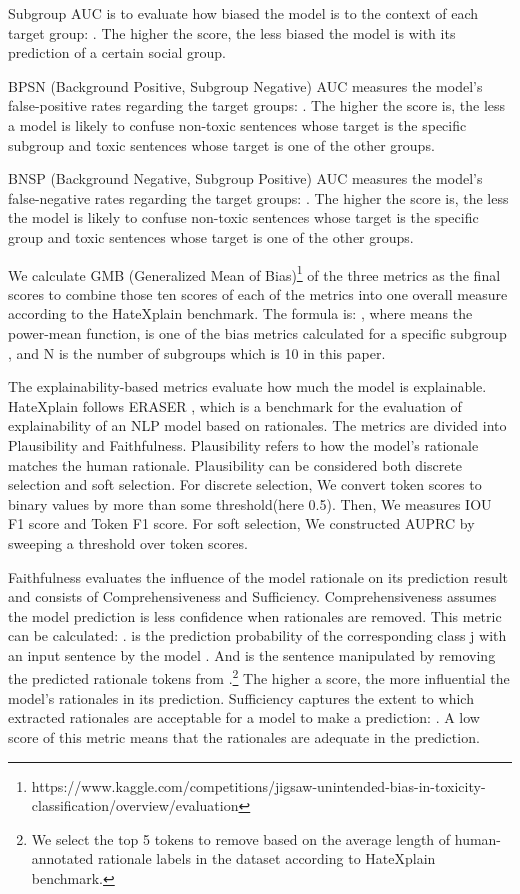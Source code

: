\documentclass[11pt]{article}
\begin{document}
Subgroup AUC is to evaluate how biased the model is to the context of each target group: .
The higher the score, the less biased the model is with its prediction of a certain social group. 


BPSN (Background Positive, Subgroup Negative) AUC measures the model's false-positive rates regarding the target groups: . 
The higher the score is, the less a model is likely to confuse non-toxic sentences whose target is the specific subgroup and toxic sentences whose target is one of the other groups. 


BNSP (Background Negative, Subgroup Positive) AUC measures the model's false-negative rates regarding the target groups: . The higher the score is, the less the model is likely to confuse non-toxic sentences whose target is the specific group and toxic sentences whose target is one of the other groups. 


We calculate GMB (Generalized Mean of Bias)\footnote[1]{https://www.kaggle.com/competitions/jigsaw-unintended-bias-in-toxicity-classification/overview/evaluation} 
of the three metrics as the final scores to combine those ten scores of each of the metrics into one overall measure according to the HateXplain benchmark.
The formula is: , where  means the  power-mean function,  is one of the bias metrics  calculated for a specific subgroup , and N is the number of subgroups which is 10 in this paper. 




The explainability-based metrics evaluate how much the model is explainable. HateXplain follows ERASER \citep{deyoung2019eraser}, which is a benchmark for the evaluation of explainability of an NLP model based on rationales. The metrics are divided into Plausibility and Faithfulness. Plausibility refers to how the model's rationale matches the human rationale. Plausibility can be considered both discrete selection and soft selection. For discrete selection, We convert token scores to binary values by more than some threshold(here 0.5). Then, We measures IOU F1 score and Token F1 score. For soft selection, We constructed AUPRC by sweeping a threshold over token scores.

Faithfulness evaluates the influence of the model rationale on its prediction result and consists of Comprehensiveness and Sufficiency. Comprehensiveness assumes the model prediction is less confidence when rationales are removed. This metric can be calculated: . 
 is the prediction probability of the corresponding class j with an input sentence  by the model . And  is the sentence manipulated by removing the predicted rationale tokens  from .\footnote[2]{We select the top 5 tokens to remove based on the average length of human-annotated rationale labels in the dataset according to HateXplain benchmark.} The higher a score, the more influential the model's rationales in its prediction.
Sufficiency captures the extent to which extracted rationales are acceptable for a model to make a prediction: . A low score of this metric means that the rationales are adequate in the prediction.
\end{document}
